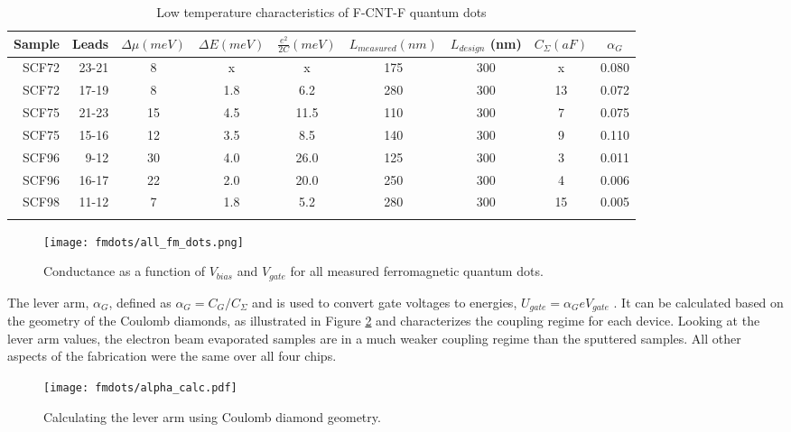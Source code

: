 \begin{table}
    \centering
    \footnotesize
    \begin{tabular}{ r | r | c c c c c c c}
        Sample & Leads & $\Delta \mu (meV)$ & $\Delta E (meV)$ & $\frac{e^2}{2C} (meV)$ & $L_{measured} (nm)$ & $L_{design}$ (nm) & $C_{\Sigma} (aF)$ & $\alpha_{G}$ \\ \hline
        SCF72 & 23-21 & 8  & x   & x    & 175 & 300 & x  & 0.080 \\ 
        SCF72 & 17-19 & 8  & 1.8 & 6.2  & 280 & 300 & 13 & 0.072 \\
        SCF75 & 21-23 & 15 & 4.5 & 11.5 & 110 & 300 & 7  & 0.075 \\
        SCF75 & 15-16 & 12 & 3.5 & 8.5  & 140 & 300 & 9  & 0.110 \\
        SCF96 & 9-12  & 30 & 4.0 & 26.0 & 125 & 300 & 3  & 0.011 \\
        SCF96 & 16-17 & 22 & 2.0 & 20.0 & 250 & 300 & 4  & 0.006 \\
        SCF98 & 11-12 & 7  & 1.8 & 5.2  & 280 & 300 & 15 & 0.005 \\
        \label{table:cold_fm_devices}  
    \end{tabular}
    \caption{Low temperature characteristics of F-CNT-F quantum dots}
\end{table}

\begin{figure}
    \centering
    \texttt{[image: fmdots/all\_fm\_dots.png]}
    \caption{Conductance as a function of $V_{bias}$ and $V_{gate}$ for all measured ferromagnetic quantum dots.}
    \label{fig:all_FM_QD}
\end{figure}

The lever arm, $\alpha_{G}$, defined as $\alpha_{G} = C_G/C_{\Sigma}$ and is used to convert gate voltages to energies, $U_{gate} = \alpha_{G}eV_{gate}$ \cite{Ihn2004}. It can be calculated based on the geometry of the Coulomb diamonds, as illustrated in Figure \ref{fig:alpha_calc} and characterizes the coupling regime for each device. Looking at the lever arm values, the electron beam evaporated samples are in a much weaker coupling regime than the sputtered samples. All other aspects of the fabrication were the same over all four chips. 

\begin{figure}
    \centering
    \texttt{[image: fmdots/alpha\_calc.pdf]}
    \caption{Calculating the lever arm using Coulomb diamond geometry.}
    \label{fig:alpha_calc}
\end{figure}

